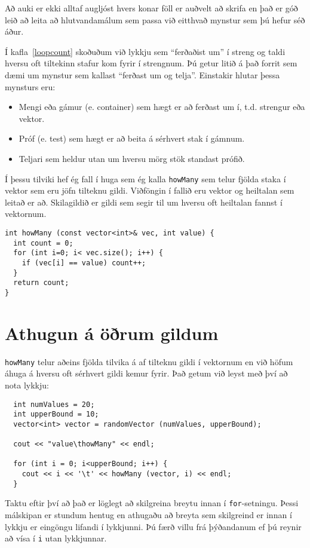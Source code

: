 
Að auki er ekki alltaf augljóst hvers konar föll er auðvelt að skrifa en 
það er góð leið að leita að hlutvandamálum sem passa við eitthvað mynstur sem þú hefur séð áður.


Í kafla~\ref{loopcount} skoðuðum við lykkju sem ``ferðaðist um'' í streng og taldi hversu oft tiltekinn stafur kom fyrir í strengnum.
Þú getur litið á það forrit sem dæmi um mynstur sem kallast ``ferðast um og telja''.
Einstakir hlutar þessa mynsturs eru:

\begin{itemize}

\item Mengi eða gámur (e. container) sem hægt er að ferðast um í, t.d. strengur eða vektor. 

\item Próf (e. test) sem hægt er að beita á sérhvert stak í gámnum.

\item Teljari sem heldur utan um hversu mörg stök standast prófið. 

\end{itemize}

Í þessu tilviki hef ég fall í huga sem ég kalla {\tt howMany} sem telur fjölda staka í vektor sem eru jöfn tilteknu gildi. 
Viðföngin í fallið eru vektor og heiltalan sem leitað er að.
Skilagildið er gildi sem segir til um hversu oft heiltalan fannst í vektornum.

\begin{verbatim}
int howMany (const vector<int>& vec, int value) {
  int count = 0;
  for (int i=0; i< vec.size(); i++) {
    if (vec[i] == value) count++;
  }
  return count;
}
\end{verbatim}


\section{Athugun á öðrum gildum}

{\tt howMany} telur aðeins fjölda tilvika á af tilteknu gildi í vektornum en við höfum áhuga á hversu oft sérhvert gildi kemur fyrir.
Það getum við leyst með því að nota lykkju:

\begin{verbatim}
  int numValues = 20;
  int upperBound = 10;
  vector<int> vector = randomVector (numValues, upperBound);

  cout << "value\thowMany" << endl;

  for (int i = 0; i<upperBound; i++) {
    cout << i << '\t' << howMany (vector, i) << endl;
  }
\end{verbatim}
%
Taktu eftir því að það er löglegt að skilgreina breytu innan í {\tt for}-setningu.
Þessi málskipan er stundum hentug en athugaðu að breyta sem skilgreind er innan í lykkju er eingöngu lifandi í lykkjunni.
Þú færð villu frá þýðandanum ef þú reynir að vísa í {\tt i} utan lykkjunnar.

